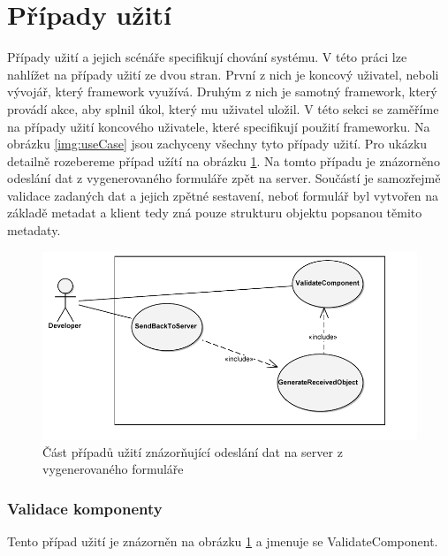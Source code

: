 \section{Případy užití}
Případy užití a jejich scénáře \cite{UmlArlow} specifikují chování systému. V této práci lze nahlížet na případy užití ze dvou stran. První z nich je koncový uživatel, neboli vývojář, který framework využívá. Druhým z nich je samotný framework, který provádí akce, aby splnil úkol, který mu uživatel uložil. V této sekci se zaměříme na případy užití koncového uživatele, které specifikují použití frameworku. Na obrázku \ref{img:useCase} jsou zachyceny všechny tyto případy užití. Pro ukázku detailně rozebereme případ užítí na obrázku \ref{img:useCaseSmall}. Na tomto případu je znázorněno odeslání dat z vygenerovaného formuláře zpět na server. Součástí je samozřejmě validace zadaných dat a jejich zpětné sestavení, neboť formulář byl vytvořen na základě metadat a klient tedy zná pouze strukturu objektu popsanou těmito metadaty. 
\begin{figure}[h!]
\begin{center}
\includegraphics{images/useCaseSmall}
\caption{Část případů užití znázorňující odeslání dat na server z vygenerovaného formuláře}
\label{img:useCaseSmall}
\end{center}
\end{figure}
\subsubsection{Validace komponenty}
Tento případ užití je znázorněn na obrázku \ref{img:useCaseSmall} a jmenuje se ValidateComponent.

